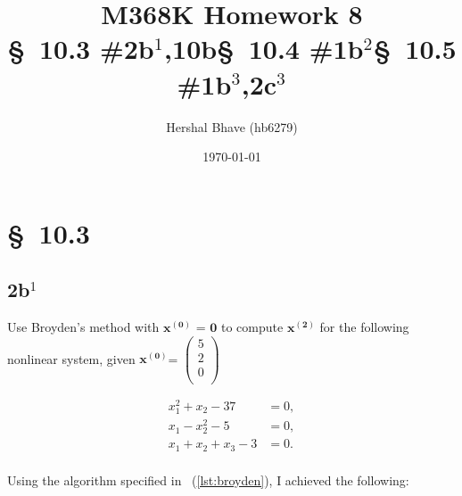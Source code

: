 \documentclass[12pt]{article}
\title{M368K Homework 8 \\ \normalsize{\S~10.3 \#2b$^1$,10b\quad \S~10.4 \#1b$^2$\quad \S~10.5 \#1b$^3$,2c$^3$}}
\author{Hershal Bhave (hb6279)}
\date{\today}
\begin{document}
\maketitle

\section{\S~10.3}
\subsection{2b$^{1}$}
Use Broyden's method with $\mathbf{x^{(0)}}$ = $\mathbf{0}$ to compute
$\mathbf{x^{(2)}}$ for the following nonlinear system, given
$\mathbf{x^{(0)}}$=
$\begin{pmatrix}
  5\\
  2\\
  0\\
\end{pmatrix}$

\begin{align*}
  \label{eq:2b}
  x^2_1+x_2-37&=0,\\
  x_1-x^2_2-5&=0,\\
  x_1+x_2+x_3-3&=0.\\
\end{align*}

Using the algorithm specified
in~\texttt{} (\cref{lst:broyden}), I achieved the
following:\\

\begin{centering}
\end{centering}

\begin{minipage}{1.0\linewidth}
  
\end{minipage}
\end{document}
